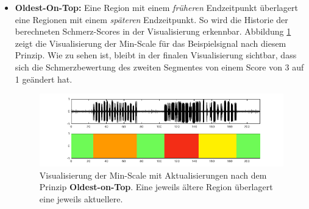\begin{itemize}
\item \textbf{Oldest-On-Top: } Eine Region mit einem \emph{früheren} Endzeitpunkt überlagert eine Regionen mit einem \emph{späteren} Endzeitpunkt. So wird die Historie der berechneten Schmerz-Scores in der Visualisierung erkennbar. Abbildung \ref{fig:viz_act_under} zeigt die Visualisierung der Min-Scale für das Beispielsignal nach diesem Prinzip. Wie zu sehen ist, bleibt in der finalen Visualisierung sichtbar, dass sich die Schmerzbewertung des zweiten Segmentes von einem Score von 3 auf 1 geändert hat.

\begin{figure}[h]
	\centering
	\includegraphics[trim={3cm 0 2cm 0},clip,width=1\textwidth]{bilder/viz_act_under_02.png}
	\caption[Visualisierung bei Aktualisierungen nach dem Prinzip Oldest-on-Top]{Visualisierung der Min-Scale mit Aktualisierungen nach dem Prinzip \textbf{Oldest-on-Top}. Eine jeweils \glqq ältere\grqq{} Region überlagert eine jeweils \glqq aktuellere\grqq{}.}
	\label{fig:viz_act_under}
\end{figure}
 
\end{itemize}
